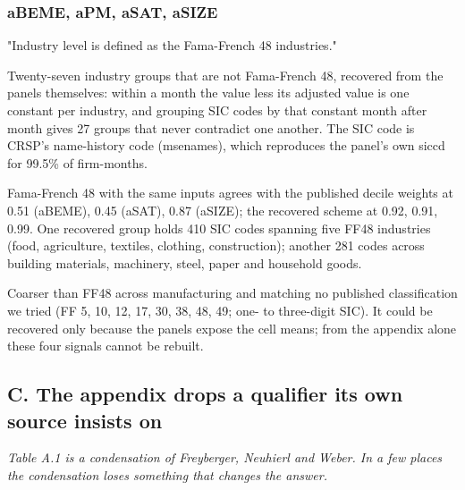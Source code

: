 \documentclass[11pt]{article}
\begin{document}
\subsubsection*{aBEME, aPM, aSAT, aSIZE}
\begin{description}[leftmargin=2.4cm,labelwidth=2.2cm,font=\normalfont\bfseries,style=sameline]
\item[Documented:] "Industry level is defined as the Fama-French 48 industries."
\item[Implemented:] Twenty-seven industry groups that are not Fama-French 48, recovered from the panels themselves: within a month the value less its adjusted value is one constant per industry, and grouping SIC codes by that constant month after month gives 27 groups that never contradict one another. The SIC code is CRSP's name-history code (msenames), which reproduces the panel's own siccd for 99.5\% of firm-months.
\item[Evidence:] Fama-French 48 with the same inputs agrees with the published decile weights at 0.51 (aBEME), 0.45 (aSAT), 0.87 (aSIZE); the recovered scheme at 0.92, 0.91, 0.99. One recovered group holds 410 SIC codes spanning five FF48 industries (food, agriculture, textiles, clothing, construction); another 281 codes across building materials, machinery, steel, paper and household goods.
\item[Why it matters:] Coarser than FF48 across manufacturing and matching no published classification we tried (FF 5, 10, 12, 17, 30, 38, 48, 49; one- to three-digit SIC). It could be recovered only because the panels expose the cell means; from the appendix alone these four signals cannot be rebuilt.
\end{description}
\subsection*{C. The appendix drops a qualifier its own source insists on}
\emph{Table A.1 is a condensation of Freyberger, Neuhierl and Weber. In a few places the condensation loses something that changes the answer.}
\end{document}
